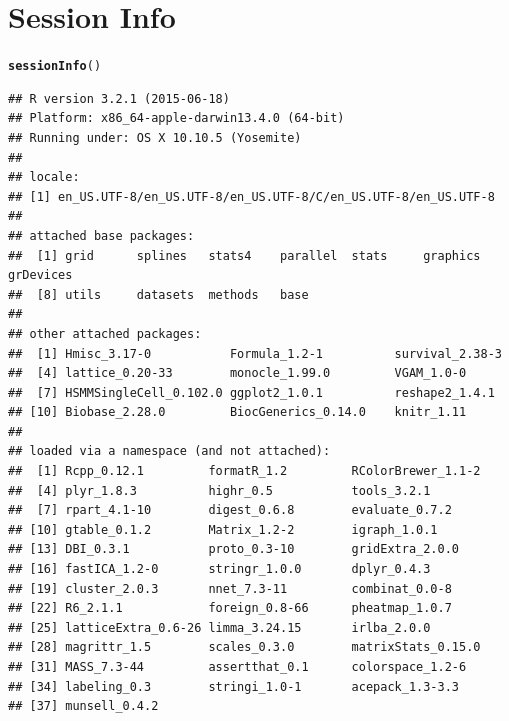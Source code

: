 \documentclass[10pt,oneside]{article}\usepackage[]{graphicx}\usepackage[]{color}
\makeatletter
\newcommand{\hlstd}[1]{\textcolor[rgb]{0.345,0.345,0.345}{#1}}%
\newcommand{\hlkwd}[1]{\textcolor[rgb]{0.737,0.353,0.396}{\textbf{#1}}}%
\newenvironment{kframe}{%
 \def\at@end@of@kframe{}%
 \ifinner\ifhmode%
  \def\at@end@of@kframe{\end{minipage}}%
  \begin{minipage}{\columnwidth}%
 \fi\fi%
 \def\FrameCommand##1{\hskip\@totalleftmargin \hskip-\fboxsep
 \colorbox{shadecolor}{##1}\hskip-\fboxsep
     \hskip-\linewidth \hskip-\@totalleftmargin \hskip\columnwidth}%
 \MakeFramed {\advance\hsize-\width
   \@totalleftmargin\z@ \linewidth\hsize
   \@setminipage}}%
 {\par\unskip\endMakeFramed%
 \at@end@of@kframe}
\newenvironment{knitrout}{}{} %
\makeatother
\begin{document}
\section{Session Info}
\begin{knitrout}
\color{fgcolor}\begin{kframe}
\begin{alltt}
\hlkwd{sessionInfo}\hlstd{()}
\end{alltt}
\begin{verbatim}
## R version 3.2.1 (2015-06-18)
## Platform: x86_64-apple-darwin13.4.0 (64-bit)
## Running under: OS X 10.10.5 (Yosemite)
## 
## locale:
## [1] en_US.UTF-8/en_US.UTF-8/en_US.UTF-8/C/en_US.UTF-8/en_US.UTF-8
## 
## attached base packages:
##  [1] grid      splines   stats4    parallel  stats     graphics  grDevices
##  [8] utils     datasets  methods   base     
## 
## other attached packages:
##  [1] Hmisc_3.17-0           Formula_1.2-1          survival_2.38-3       
##  [4] lattice_0.20-33        monocle_1.99.0         VGAM_1.0-0            
##  [7] HSMMSingleCell_0.102.0 ggplot2_1.0.1          reshape2_1.4.1        
## [10] Biobase_2.28.0         BiocGenerics_0.14.0    knitr_1.11            
## 
## loaded via a namespace (and not attached):
##  [1] Rcpp_0.12.1         formatR_1.2         RColorBrewer_1.1-2 
##  [4] plyr_1.8.3          highr_0.5           tools_3.2.1        
##  [7] rpart_4.1-10        digest_0.6.8        evaluate_0.7.2     
## [10] gtable_0.1.2        Matrix_1.2-2        igraph_1.0.1       
## [13] DBI_0.3.1           proto_0.3-10        gridExtra_2.0.0    
## [16] fastICA_1.2-0       stringr_1.0.0       dplyr_0.4.3        
## [19] cluster_2.0.3       nnet_7.3-11         combinat_0.0-8     
## [22] R6_2.1.1            foreign_0.8-66      pheatmap_1.0.7     
## [25] latticeExtra_0.6-26 limma_3.24.15       irlba_2.0.0        
## [28] magrittr_1.5        scales_0.3.0        matrixStats_0.15.0 
## [31] MASS_7.3-44         assertthat_0.1      colorspace_1.2-6   
## [34] labeling_0.3        stringi_1.0-1       acepack_1.3-3.3    
## [37] munsell_0.4.2
\end{verbatim}
\end{kframe}
\end{knitrout}



\end{document}
